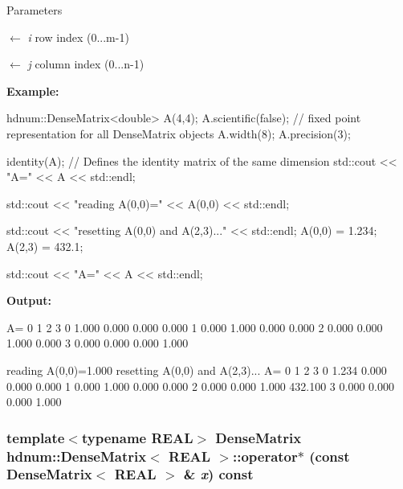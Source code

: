 \begin{DoxyParams}{Parameters}
\item[\mbox{$\leftarrow$} {\em i}]row index (0...m-\/1) \item[\mbox{$\leftarrow$} {\em j}]column index (0...n-\/1)\end{DoxyParams}
{\bfseries Example:} 
\begin{DoxyCode}
  hdnum::DenseMatrix<double> A(4,4);
  A.scientific(false); // fixed point representation for all DenseMatrix objects
  A.width(8);
  A.precision(3);

  identity(A);  // Defines the identity matrix of the same dimension
  std::cout << "A=" << A << std::endl;

  std::cout << "reading A(0,0)=" << A(0,0) << std::endl;

  std::cout << "resetting A(0,0) and A(2,3)..." << std::endl;
  A(0,0) = 1.234;
  A(2,3) = 432.1;
  
  std::cout << "A=" << A << std::endl;
\end{DoxyCode}


{\bfseries Output:} \begin{DoxyVerb}
A=
                    0        1        2        3 
          0     1.000    0.000    0.000    0.000 
          1     0.000    1.000    0.000    0.000 
          2     0.000    0.000    1.000    0.000 
          3     0.000    0.000    0.000    1.000 

reading A(0,0)=1.000
resetting A(0,0) and A(2,3)...
A=
                    0        1        2        3 
          0     1.234    0.000    0.000    0.000 
          1     0.000    1.000    0.000    0.000 
          2     0.000    0.000    1.000  432.100 
          3     0.000    0.000    0.000    1.000 
	  \end{DoxyVerb}
 \hypertarget{classhdnum_1_1DenseMatrix_a32bf5f7e4113e65aaeee04177d22a522}{
\subsubsection[{operator$\ast$}]{\setlength{\rightskip}{0pt plus 5cm}template$<$typename REAL$>$ {\bf DenseMatrix} {\bf hdnum::DenseMatrix}$<$ REAL $>$::operator$\ast$ (const {\bf DenseMatrix}$<$ REAL $>$ \& {\em x}) const}}
\label{classhdnum_1_1DenseMatrix_a32bf5f7e4113e65aaeee04177d22a522}


